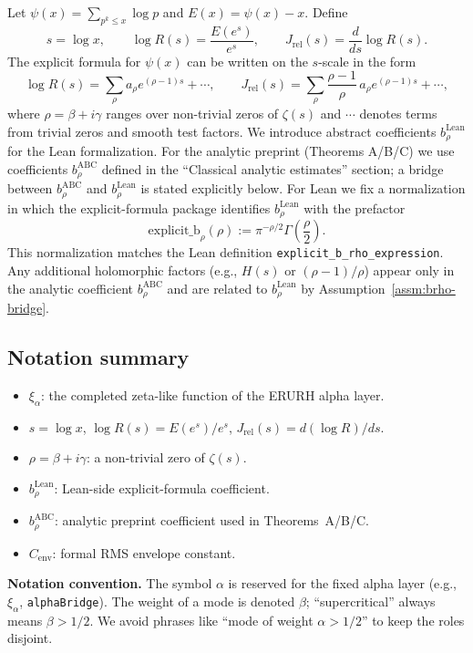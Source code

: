 \documentclass[11pt]{article}
\theoremstyle{plain}
\theoremstyle{definition}
\newcommand{\brhoLean}{b_\rho^{\mathrm{Lean}}}
\newcommand{\brhoABC}{b_\rho^{\mathrm{ABC}}}
\begin{document}
Let $\psi(x) = \sum_{p^k\le x} \log p$ and $E(x) = \psi(x) - x$. Define
\begin{equation}
  s = \log x, \qquad
  \log R(s) = \frac{E(e^s)}{e^s}, \qquad
  J_{\mathrm{rel}}(s) = \frac{d}{ds}\log R(s).
\end{equation}
The explicit formula for $\psi(x)$ can be written on the $s$-scale in the form
\begin{equation}\label{eq:explicit-form}
  \log R(s) = \sum_{\rho} a_\rho e^{(\rho-1)s} + \cdots, \qquad
  J_{\mathrm{rel}}(s) = \sum_{\rho} \frac{\rho-1}{\rho}\, a_\rho e^{(\rho-1)s} + \cdots,
\end{equation}
where $\rho = \beta + i\gamma$ ranges over non-trivial zeros of $\zeta(s)$ and
$\cdots$ denotes terms from trivial zeros and smooth test factors. We introduce
abstract coefficients $\brhoLean$ for the Lean formalization. For the analytic
preprint (Theorems A/B/C) we use coefficients $\brhoABC$ defined in the
``Classical analytic estimates'' section; a bridge between $\brhoABC$ and
$\brhoLean$ is stated explicitly below. For Lean we fix a normalization in
which the explicit-formula package identifies $\brhoLean$ with the prefactor
\[
  \mathrm{explicit\_b}_\rho(\rho) := \pi^{-\rho/2}\Gamma\!\left(\frac{\rho}{2}\right).
\]
This normalization matches the Lean definition
\texttt{explicit\_b\_rho\_expression}. Any additional holomorphic factors (e.g.,
$H(s)$ or $(\rho-1)/\rho$) appear only in the analytic coefficient $\brhoABC$
and are related to $\brhoLean$ by Assumption~\ref{assm:brho-bridge}.

\subsection*{Notation summary}
\begin{itemize}
  \item $\xi_\alpha$: the completed zeta-like function of the ERURH alpha layer.
  \item $s=\log x$, $\log R(s)=E(e^s)/e^s$, $J_{\mathrm{rel}}(s)=d(\log R)/ds$.
  \item $\rho=\beta+i\gamma$: a non-trivial zero of $\zeta(s)$.
  \item $\brhoLean$: Lean-side explicit-formula coefficient.
  \item $\brhoABC$: analytic preprint coefficient used in Theorems~A/B/C.
  \item $C_{\mathrm{env}}$: formal RMS envelope constant.
\end{itemize}
\noindent \textbf{Notation convention.} The symbol $\alpha$ is reserved for the
fixed alpha layer (e.g., $\xi_\alpha$, \texttt{alphaBridge}). The weight of a
mode is denoted $\beta$; ``supercritical'' always means $\beta>1/2$. We avoid
phrases like ``mode of weight $\alpha>1/2$'' to keep the roles disjoint.
\end{document}
